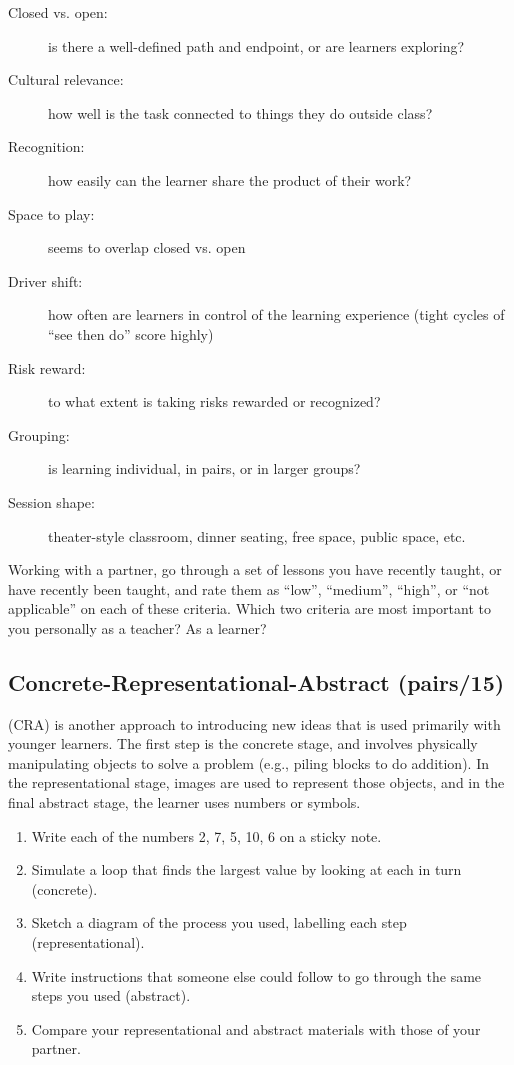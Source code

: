 \begin{description}
\item[Closed vs. open:]
is there a well-defined path and endpoint, or are learners
exploring?
\item[Cultural relevance:]
how well is the task connected to things they do outside class?
\item[Recognition:]
how easily can the learner share the product of their work?
\item[Space to play:]
seems to overlap closed vs. open
\item[Driver shift:]
how often are learners in control of the learning experience (tight
cycles of ``see then do'' score highly)
\item[Risk reward:]
to what extent is taking risks rewarded or recognized?
\item[Grouping:]
is learning individual, in pairs, or in larger groups?
\item[Session shape:]
theater-style classroom, dinner seating, free space, public space,
etc.
\end{description}

Working with a partner, go through a set of lessons you have recently
taught, or have recently been taught, and rate them as ``low'', ``medium'',
``high'', or ``not applicable'' on each of these criteria. Which two
criteria are most important to you personally as a teacher? As a
learner?

\subsection*{Concrete-Representational-Abstract (pairs/15)}

 (CRA) is another approach to
introducing new ideas that is used primarily with younger
learners. The first step is the concrete stage, and involves
physically manipulating objects to solve a problem (e.g., piling
blocks to do addition). In the representational stage, images are
used to represent those objects, and in the final abstract stage, the
learner uses numbers or symbols.

\begin{enumerate}
\item
  Write each of the numbers 2, 7, 5, 10, 6 on a sticky note.
\item
  Simulate a loop that finds the largest value by looking at each in
  turn (concrete).
\item
  Sketch a diagram of the process you used, labelling each step
  (representational).
\item
  Write instructions that someone else could follow to go through the
  same steps you used (abstract).
\item
  Compare your representational and abstract materials with those of
  your partner.
\end{enumerate}
